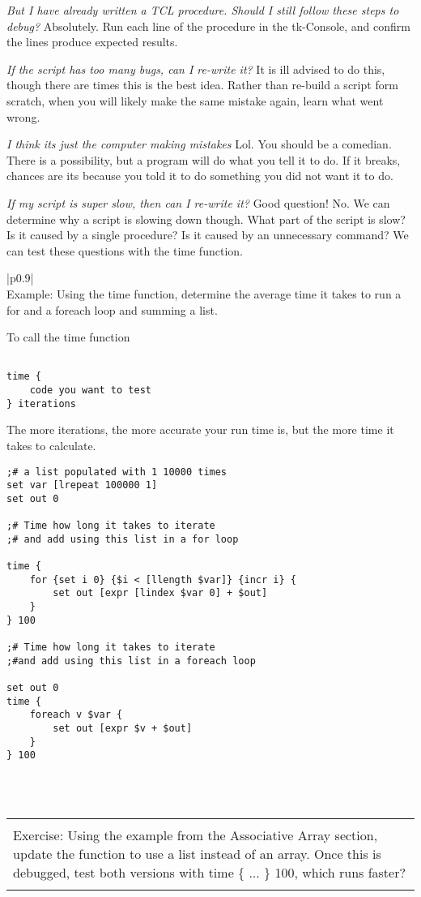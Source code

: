 \documentclass[letter,11pt]{article}
\newenvironment{exercise}
    {\begin{center}
    \begin{tabular}{|p{0.9\textwidth}|}
    \hline\\
    }
    { 
    \\\\\hline
    \end{tabular} 
    \end{center}
    }
\begin{document}

\textit{But I have already written a TCL procedure. Should I still follow these steps to debug?} Absolutely. Run each line of the procedure in the tk-Console, and confirm the lines produce expected results.

\textit{If the script has too many bugs, can I re-write it?} It is ill advised to do this, though there are times this is the best idea. Rather than re-build a script form scratch, when you will likely make the same mistake again, learn what went wrong.

\textit{I think its just the computer making mistakes} Lol. You should be a comedian. There is a possibility, but a program will do what you tell it to do. If it breaks, chances are its because you told it to do something you did not want it to do.

\textit{If my script is super slow, then can I re-write it?} Good question! No. We can determine why a script is slowing down though. What part of the script is slow? Is it caused by a single procedure? Is it caused by an unnecessary command? We can test these questions with the time function.

\begin{exercise}
Example: Using the time function, determine the average time it takes to run a for and a foreach loop and summing a list.

To call the time function 

\begin{lstlisting}

time {
    code you want to test
} iterations

\end{lstlisting}

The more iterations, the more accurate your run time is, but the more time it takes to calculate.

\begin{lstlisting}
;# a list populated with 1 10000 times
set var [lrepeat 100000 1] 
set out 0

;# Time how long it takes to iterate 
;# and add using this list in a for loop

time {
    for {set i 0} {$i < [llength $var]} {incr i} {
        set out [expr [lindex $var 0] + $out]
    }
} 100

;# Time how long it takes to iterate 
;#and add using this list in a foreach loop

set out 0
time {
    foreach v $var {
        set out [expr $v + $out]
    }
} 100

\end{lstlisting}
\end{exercise}


\begin{exercise}

Exercise: Using the example from the Associative Array section, update the function to use a list instead of an array. Once this is debugged, test both versions with time \{ ... \} 100, which runs faster?

\end{exercise}
\end{document}

